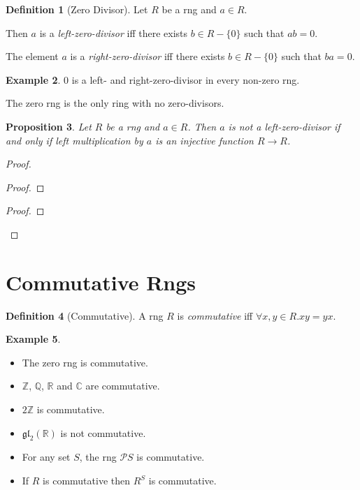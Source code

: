\documentclass{book}
\let\qed\relax
\newtheorem{prop}{Proposition}[chapter]
\theoremstyle{definition}
\newtheorem{df}[prop]{Definition}
\newtheorem{ex}[prop]{Example}
\newcommand{\gl}[2]{\ensuremath{\mathfrak{gl}_{#1} \left( {#2} \right)}}
\begin{document}
\begin{df}[Zero Divisor]
Let $R$ be a rng and $a \in R$.

Then $a$ is a \emph{left-zero-divisor} iff there exists $b \in R - \{0\}$ such that $ab = 0$.

The element $a$ is a \emph{right-zero-divisor} iff there exists $b \in R - \{0\}$ such that $ba = 0$.
\end{df}

\begin{ex}
0 is a left- and right-zero-divisor in every non-zero rng.

The zero rng is the only ring with no zero-divisors.
\end{ex}

\begin{prop}
Let $R$ be a rng and $a \in R$. Then $a$ is not a left-zero-divisor if and only if left multiplication by $a$ is an injective function $R \rightarrow R$.
\end{prop}

\begin{proof}
\pf
{}
\begin{proof}
\end{proof}
\begin{proof}
\end{proof}
\qed
\end{proof}

\section{Commutative Rngs}

\begin{df}[Commutative]
A rng $R$ is \emph{commutative} iff $\forall x,y \in R. xy = yx$.
\end{df}

\begin{ex}
\begin{itemize}
\item The zero rng is commutative.
\item $\mathbb{Z}$, $\mathbb{Q}$, $\mathbb{R}$ and $\mathbb{C}$ are commutative.
\item
$2 \mathbb{Z}$ is commutative.
\item $\gl{2}{\mathbb{R}}$ is not commutative.
\item For any set $S$, the rng $\mathcal{P} S$ is commutative.
\item If $R$ is commutative then $R^S$ is commutative.
\end{itemize}
\end{ex}
\end{document}
